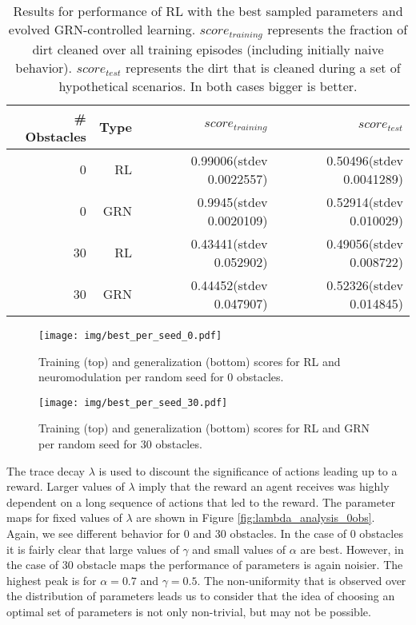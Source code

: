 \documentclass[conference]{IEEEtran}
\begin{document}
\begin{table*}
\centering
\begin{tabular}{|r|r|r|r|}
\hline
\# Obstacles & Type & $score_{training}$ & $score_{test}$ \\
\hline
0 & RL & 0.99006(stdev 0.0022557) & 0.50496(stdev 0.0041289) \\
0 & GRN & 0.9945(stdev 0.0020109) & 0.52914(stdev 0.010029) \\
30 & RL & 0.43441(stdev 0.052902) & 0.49056(stdev 0.008722) \\
30 & GRN & 0.44452(stdev 0.047907) & 0.52326(stdev 0.014845) \\
\hline
\end{tabular}
\caption{Results for performance of RL with the best sampled parameters and
evolved GRN-controlled learning.
$score_{training}$ represents the fraction of dirt cleaned over all training
episodes (including initially naive behavior). $score_{test}$ represents the dirt that is
cleaned during a set of hypothetical scenarios. In both cases bigger is better.}
\label{tbl:result_comparison}
\end{table*}

\begin{figure}
\centering
\texttt{[image: img/best\_per\_seed\_0.pdf]}
\caption{Training (top) and generalization (bottom) scores for RL and neuromodulation per random seed for 0 obstacles.}
\label{fig:bestperseed0}
\vspace{-5pt}
\end{figure}

\begin{figure}
\centering
\texttt{[image: img/best\_per\_seed\_30.pdf]}
\caption{Training (top) and generalization (bottom) scores for RL and GRN per random seed for 30 obstacles.}
\label{fig:bestperseed30}
\vspace{-5pt}
\end{figure}

The trace decay $\lambda$ is used to discount the significance of actions
leading up to a reward. Larger values of $\lambda$ imply that the reward
an agent receives was highly dependent on a long sequence of actions that 
led to the reward. The parameter maps for fixed values of $\lambda$ are
shown in Figure \ref{fig:lambda_analysis_0obs}. Again, we see different
behavior for 0 and 30 obstacles. In the case of 0 obstacles it is fairly clear
that large values of $\gamma$ and small values of $\alpha$ are best. However,
in the case of 30 obstacle maps the performance of parameters is again noisier.
The highest peak is for $\alpha = 0.7$ and $\gamma = 0.5$. The non-uniformity
that is observed over the distribution of parameters leads us to consider that
the idea of choosing an optimal set of parameters is not only non-trivial, but
may not be possible. 
\end{document}
